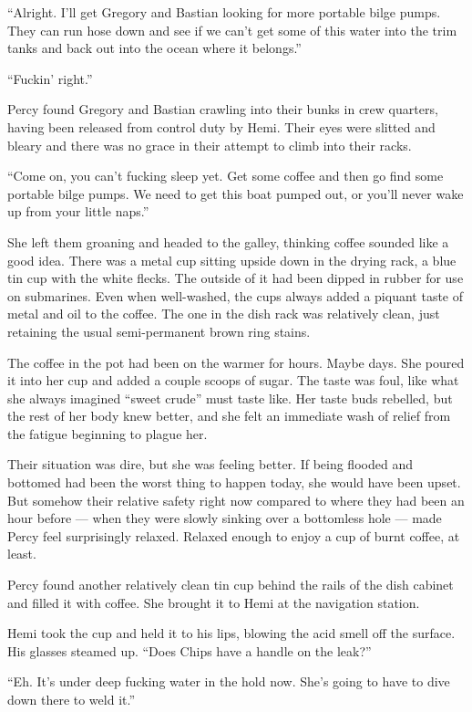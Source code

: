 \documentclass[
]{scrbook}
\begin{document}
``Alright. I'll get Gregory and Bastian looking for more portable bilge
pumps. They can run hose down and see if we can't get some of this water
into the trim tanks and back out into the ocean where it belongs.''

``Fuckin' right.''

\bigskip

Percy found Gregory and Bastian crawling into their bunks in crew
quarters, having been released from control duty by Hemi. Their eyes
were slitted and bleary and there was no grace in their attempt to climb
into their racks.

``Come on, you can't fucking sleep yet. Get some coffee and then go find
some portable bilge pumps. We need to get this boat pumped out, or
you'll never wake up from your little naps.''

She left them groaning and headed to the galley, thinking coffee sounded
like a good idea. There was a metal cup sitting upside down in the
drying rack, a blue tin cup with the white flecks. The outside of it had
been dipped in rubber for use on submarines. Even when well-washed, the
cups always added a piquant taste of metal and oil to the coffee. The
one in the dish rack was relatively clean, just retaining the usual
semi-permanent brown ring stains.

The coffee in the pot had been on the warmer for hours. Maybe days. She
poured it into her cup and added a couple scoops of sugar. The taste was
foul, like what she always imagined ``sweet crude'' must taste like. Her
taste buds rebelled, but the rest of her body knew better, and she felt
an immediate wash of relief from the fatigue beginning to plague her.

Their situation was dire, but she was feeling better. If being flooded
and bottomed had been the worst thing to happen today, she would have
been upset. But somehow their relative safety right now compared to
where they had been an hour before --- when they were slowly sinking
over a bottomless hole --- made Percy feel surprisingly relaxed. Relaxed
enough to enjoy a cup of burnt coffee, at least.

Percy found another relatively clean tin cup behind the rails of the
dish cabinet and filled it with coffee. She brought it to Hemi at the
navigation station.

Hemi took the cup and held it to his lips, blowing the acid smell off
the surface. His glasses steamed up. ``Does Chips have a handle on the
leak?''

``Eh. It's under deep fucking water in the hold now. She's going to have
to dive down there to weld it.''
\end{document}
